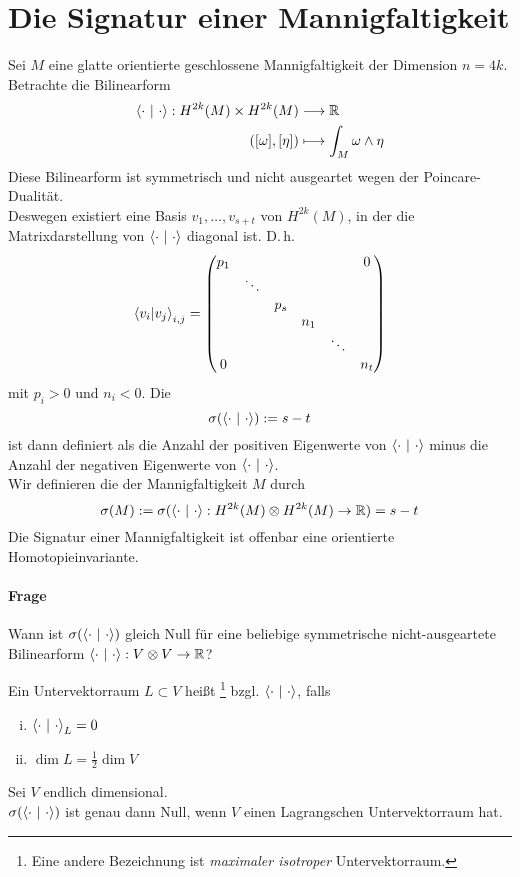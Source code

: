 \section{Die Signatur einer Mannigfaltigkeit}
Sei $M$ eine glatte orientierte geschlossene Mannigfaltigkeit der Dimension $n = 4k$.\\
Betrachte die Bilinearform
\begin{align*}
\left<\cdot ~|~\cdot\right>: H^{2k}(M) \times H^{2k}(M) & \overset{}{\longrightarrow} \mathbb{R}\\
([\omega], [\eta]) &\longmapsto \int_M \omega \wedge \eta
\end{align*}
Diese Bilinearform ist symmetrisch und nicht ausgeartet wegen der Poincare-Dualität.\\
Deswegen existiert eine Basis $v_1, \ldots, v_{s+t}$ von $H^{2k}(M)$, in der die Matrixdarstellung von $\left<\cdot~|~\cdot\right>$ diagonal ist. D.\,h.
\[ \left<v_i|v_j\right>_{i,j} = \left(
\begin{matrix}
	p_1 &        &     &     &        &  0   \\
	    & \ddots &     &     &        &  \\
	    &        & p_s &     &        &     \\
	    &        &     & n_1 &        &     \\
	    &        &     &     & \ddots &     \\
	0    &        &     &     &        & n_t
\end{matrix}
\right) \]
mit $p_i >0$ und $n_i< 0$. Die  
\[\sigma(\left<\cdot~|~\cdot\right>):= s-t\]
ist dann definiert als die Anzahl der positiven Eigenwerte von $\left<\cdot~|~\cdot\right>$ minus die Anzahl der negativen Eigenwerte von $\left<\cdot~|~\cdot\right>$.\\
Wir definieren die  der Mannigfaltigkeit $M$ durch
\[ \sigma(M):= \sigma(\left<\cdot~|~\cdot\right> : H^{2k}(M) \otimes H^{2k}(M) \overset{}{\rightarrow} \mathbb{R})= s-t\]
Die Signatur einer Mannigfaltigkeit ist offenbar eine orientierte Homotopieinvariante.

\paragraph{Frage}
Wann ist $\sigma(\left<\cdot ~|~\cdot\right>)$ gleich Null für eine beliebige symmetrische nicht-ausgeartete Bilinearform $\left<\cdot~|~\cdot\right> : V\otimes V \overset{}{\rightarrow} \mathbb{R}$?

\Def{}
Ein Untervektorraum $L\subset V$ heißt \footnote{Eine andere Bezeichnung ist \textit{maximaler isotroper} Untervektorraum.} bzgl. $\left<\cdot ~|~\cdot\right>$, falls
\begin{enumerate}[i.)]
	\item $\left<\cdot ~|~\cdot\right>_{L} = 0$
	\item $\dim L = \frac{1}{2} \dim V$
\end{enumerate}

\Satz{}
\label{SatzLagrangeRaum}
Sei $V$ endlich dimensional.\\
$\sigma(\left<\cdot ~|~\cdot\right>)$ ist genau dann Null, wenn $V$ einen Lagrangschen Untervektorraum hat.
